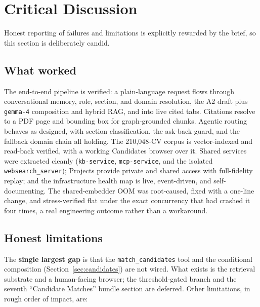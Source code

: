\section{Critical Discussion}
\label{sec:discussion}

Honest reporting of failures and limitations is explicitly rewarded by the brief, so this
section is deliberately candid.

\subsection{What worked}

The end-to-end pipeline is verified: a plain-language request flows through conversational
memory, role, section, and domain resolution, the A2 draft plus \verb|gemma-4| composition
and hybrid RAG, and into live cited tabs. Citations resolve to a PDF page and bounding box
for graph-grounded chunks. Agentic routing behaves as designed, with section
classification, the ask-back guard, and the fallback domain chain all holding. The
210,048-CV corpus is vector-indexed and read-back verified, with a working Candidates
browser over it. Shared services were extracted cleanly (\verb|kb-service|,
\verb|mcp-service|, and the isolated \verb|websearch_server|); Projects provide private and
shared access with full-fidelity replay; and the infrastructure health map is live,
event-driven, and self-documenting. The shared-embedder OOM was root-caused, fixed with a
one-line change, and stress-verified flat under the exact concurrency that had crashed it
four times, a real engineering outcome rather than a workaround.

\subsection{Honest limitations}
\label{sec:limitations}

The \textbf{single largest gap} is that the \verb|match_candidates| tool and the
conditional composition (Section~\ref{sec:candidates}) are not wired. What exists is the
retrieval substrate and a human-facing browser; the threshold-gated branch and the seventh
``Candidate Matches'' bundle section are deferred. Other limitations, in rough order of
impact, are:

